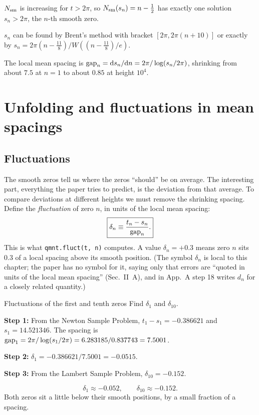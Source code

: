 \begin{keyideas}
\item $N_{\mathrm{sm}}$ is increasing for $t>2\pi$, so $N_{\mathrm{sm}}(s_n)=n-\tfrac12$ has exactly one solution $s_n>2\pi$, the $n$-th smooth zero.
\item $s_n$ can be found by Brent's method with bracket $[2\pi,2\pi(n+10)]$ or exactly by $s_n=2\pi(n-\frac{11}8)/W((n-\frac{11}8)/e)$.
\item The local mean spacing is $\mathrm{gap}_n=\mathrm{d} s_n/\mathrm{d} n=2\pi/\log(s_n/2\pi)$, shrinking from about $7.5$ at $n=1$ to about $0.85$ at height $10^4$.
\end{keyideas}

\section{Unfolding and fluctuations in mean spacings}\label{sec:counting-zeros-unfold}

\subsection{Fluctuations}

The smooth zeros tell us where the zeros ``should'' be on average. The interesting part, everything the paper tries to predict, is the deviation from that average. To compare deviations at different heights we must remove the shrinking spacing. Define the \emph{fluctuation} of zero $n$, in units of the local mean spacing:
\begin{equation}
\boxed{\delta_n\equiv\frac{t_n-s_n}{\mathrm{gap}_n}.}
\label{eq:counting-zeros-fluct}
\end{equation}
This is what \texttt{qmnt.fluct(t, n)} computes. A value $\delta_n=+0.3$ means zero $n$ sits $0.3$ of a local spacing above its smooth position. (The symbol $\delta_n$ is local to this chapter; the paper has no symbol for it, saying only that errors are ``quoted in units of the local mean spacing'' (Sec.~II~A), and in App.~A step 18 writes $d_n$ for a closely related quantity.)

\begin{sample}{Fluctuations of the first and tenth zeros}
Find $\delta_1$ and $\delta_{10}$.

\textbf{Step 1:} From the Newton Sample Problem, $t_1-s_1=-0.386621$ and $s_1=14.521346$. The spacing is $\mathrm{gap}_1=2\pi/\log(s_1/2\pi)=6.283185/0.837743=7.5001$.

\textbf{Step 2:} $\delta_1=-0.386621/7.5001=-0.0515$.

\textbf{Step 3:} From the Lambert Sample Problem, $\delta_{10}=-0.152$.

\[
\boxed{\delta_1\approx-0.052,\qquad\delta_{10}\approx-0.152.}
\]
Both zeros sit a little below their smooth positions, by a small fraction of a spacing.
\end{sample}

